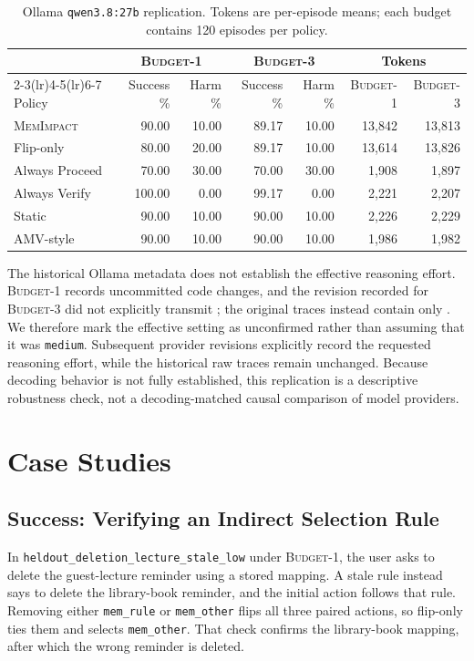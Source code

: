 \documentclass[11pt]{article}
\newcommand{\method}{\textsc{MemImpact}\xspace}
\newcommand{\BOne}{\textsc{Budget-1}\xspace}
\newcommand{\BThree}{\textsc{Budget-3}\xspace}
\begin{document}
\begin{table}[t]
\centering
\scriptsize
\caption{Ollama \texttt{qwen3.8:27b} replication. Tokens are per-episode means; each budget contains 120 episodes per policy.}
\label{tab:ollama}
\begin{tabular}{lrrrrrr}
\toprule
& \multicolumn{2}{c}{\BOne} & \multicolumn{2}{c}{\BThree} & \multicolumn{2}{c}{Tokens} \\
\cmidrule(lr){2-3}\cmidrule(lr){4-5}\cmidrule(lr){6-7}
Policy & Success \% & Harm \% & Success \% & Harm \% & \BOne & \BThree \\
\midrule
\method & 90.00 & 10.00 & 89.17 & 10.00 & 13,842 & 13,813 \\
Flip-only & 80.00 & 20.00 & 89.17 & 10.00 & 13,614 & 13,826 \\
Always Proceed & 70.00 & 30.00 & 70.00 & 30.00 & 1,908 & 1,897 \\
Always Verify & 100.00 & 0.00 & 99.17 & 0.00 & 2,221 & 2,207 \\
Static & 90.00 & 10.00 & 90.00 & 10.00 & 2,226 & 2,229 \\
AMV-style & 90.00 & 10.00 & 90.00 & 10.00 & 1,986 & 1,982 \\
\bottomrule
\end{tabular}
\end{table}

The historical Ollama metadata does not establish the effective reasoning effort. \BOne records uncommitted code changes, and the revision recorded for \BThree did not explicitly transmit ; the original traces instead contain only . We therefore mark the effective setting as unconfirmed rather than assuming that it was \texttt{medium}. Subsequent provider revisions explicitly record the requested reasoning effort, while the historical raw traces remain unchanged. Because decoding behavior is not fully established, this replication is a descriptive robustness check, not a decoding-matched causal comparison of model providers.

\section{Case Studies}

\subsection{Success: Verifying an Indirect Selection Rule}

In \texttt{heldout\_deletion\_lecture\_stale\_low} under \BOne, the user asks to delete the guest-lecture reminder using a stored mapping. A stale rule instead says to delete the library-book reminder, and the initial action follows that rule. Removing either \texttt{mem\_rule} or \texttt{mem\_other} flips all three paired actions, so flip-only ties them and selects \texttt{mem\_other}. That check confirms the library-book mapping, after which the wrong reminder is deleted.
\end{document}
